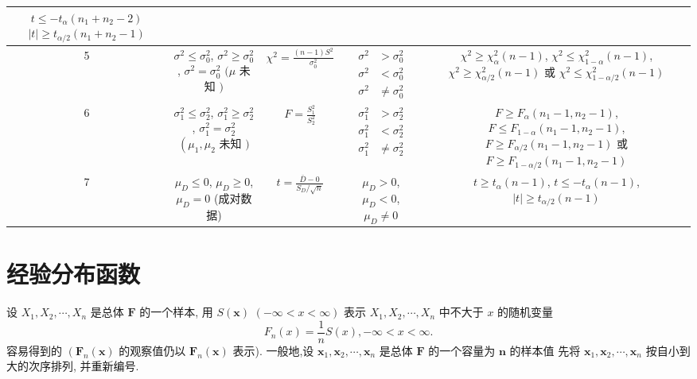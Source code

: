 \begin{table}[]
\begin{tabular}{c|c|c|c|c}
    $ t \leq-t_{\alpha}\left(n_{1}+n_{2}-2\right) $
    $ |t| \geq t_{\alpha / 2}\left(n_{1}+n_{2}-1\right) $ \\ \hline
    5 & $ \sigma^{2} \leq \sigma_{0}^{2} $,
    $ \sigma^{2} \geq \sigma_{0}^{2} $,
    $ \sigma^{2}=\sigma_{0}^{2} $
    $ (\mu $ 未知 $ ) $ & $ \chi^{2}=\frac{(n-1) S^{2}}{\sigma_{0}^{2}} $ & $ \begin{aligned} \sigma^{2} &>\sigma_{0}^{2} \\ \sigma^{2} &<\sigma_{0}^{2} \\ \sigma^{2} & \neq \sigma_{0}^{2} \end{aligned} $ & $ \chi^{2} \geq \chi_{\alpha}^{2}(n-1) $,
    $ \chi^{2} \leq \chi_{1-\alpha}^{2}(n-1) $,
    $ \chi^{2} \geq \chi_{\alpha / 2}^{2}(n-1) $ 或
    $ \chi^{2} \leq \chi_{1-\alpha / 2}^{2}(n-1) $ \\ \hline
    6 & $ \sigma_{1}^{2} \leq \sigma_{2}^{2} $,
    $ \sigma_{1}^{2} \geq \sigma_{2}^{2} $,
    $ \sigma_{1}^{2}=\sigma_{2}^{2} $
    $ \left(\mu_{1}, \mu_{2}\right. $ 未知 $ ) $ & $ F=\frac{S_{1}^{2}}{S_{2}^{2}} $ & $ \begin{aligned} \sigma_{1}^{2} &>\sigma_{2}^{2} \\ \sigma_{1}^{2} &<\sigma_{2}^{2} \\ \sigma_{1}^{2} & \neq \sigma_{2}^{2} \end{aligned} $ & $ F \geq F_{\alpha}\left(n_{1}-1, n_{2}-1\right) $,
    $ F \leq F_{1-\alpha}\left(n_{1}-1, n_{2}-1\right) $,
    $ F \geq F_{\alpha / 2}\left(n_{1}-1, n_{2}-1\right) $ 或
    $ F \geq F_{1-\alpha / 2}\left(n_{1}-1, n_{2}-1\right) $ \\ \hline
    7 & $ \mu_{D} \leq 0 $,
    $ \mu_{D} \geq 0 $,
    $ \mu_{D}=0 $
    (成对数据) & $ t=\frac{\bar{D}-0}{S_{D} / \sqrt{n}} $ & $ \mu_{D}>0 $,
    $ \mu_{D}<0 $,
    $ \mu_{D} \neq 0 $ &  $ t \geq t_{\alpha}(n-1) $,
    $ t \leq-t_{\alpha}(n-1) $,
    $ |t| \geq t_{\alpha / 2}(n-1) $
    \end{tabular}
\end{table}

\section{经验分布函数}

设 $ X_{1}, X_{2}, \cdots, X_{n} $ 是总体 $ \boldsymbol{F} $ 的一个样本, 用 $ S(\boldsymbol{x}) $
$ (-\infty<x<\infty) $ 表示 $ X_{1}, X_{2}, \cdots, X_{n} $ 中不大于 $ x $ 的随机变量
$$
F_{n}(x)=\frac{1}{n} S(x),-\infty<x<\infty .
$$
容易得到的 $ \left(\boldsymbol{F}_{n}(\boldsymbol{x})\right. $ 的观察值仍以 $ \boldsymbol{F}_{n}(\boldsymbol{x}) $ 表示). 
一般地,设 $ \boldsymbol{x}_{1}, \boldsymbol{x}_{2}, \cdots, \boldsymbol{x}_{n} $ 是总体 $ \boldsymbol{F} $ 的一个容量为 $ \boldsymbol{n} $ 的样本值
先将 $ \boldsymbol{x}_{1}, \boldsymbol{x}_{2}, \cdots, \boldsymbol{x}_{n} $ 按自小到大的次序排列, 并重新编号. 

